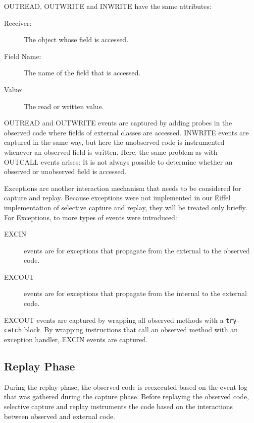 OUTREAD, OUTWRITE and INWRITE have the same attributes:

\begin{description}
 \item [Receiver:] The object whose field is accessed.
 \item [Field Name:] The name of the field that is accessed.
 \item [Value:] The read or written value.
\end{description}

OUTREAD and OUTWRITE events are captured by adding probes in the observed code where fields of external classes are accessed. INWRITE events are captured in the same way, but here the unobserved code is instrumented whenever an observed field is written. Here, the same problem as with OUTCALL events arises: It is not always possible to determine whether an observed or unobserved field is accessed.

Exceptions are another interaction mechanism that needs to be considered for capture and replay. Because exceptions were not implemented in our Eiffel implementation of selective capture and replay, they will be treated only briefly. For Exceptions, to more types of events were introduced:
\begin{description}
 \item [EXCIN] events are for exceptions that propagate from the external to the observed code.
 \item [EXCOUT] events are for exceptions that propagate from the internal to the external code.
\end{description}
EXCOUT events are captured by wrapping all observed methods with a \texttt{try-catch} block. By wrapping instructions that call an observed method with an exception handler,  EXCIN events are captured.

\subsection{Replay Phase}
During the replay phase, the observed code is reexecuted based on the event log that was gathered during the capture phase. Before replaying the observed code, selective capture and replay instruments the code based on the interactions between observed and external code. 

